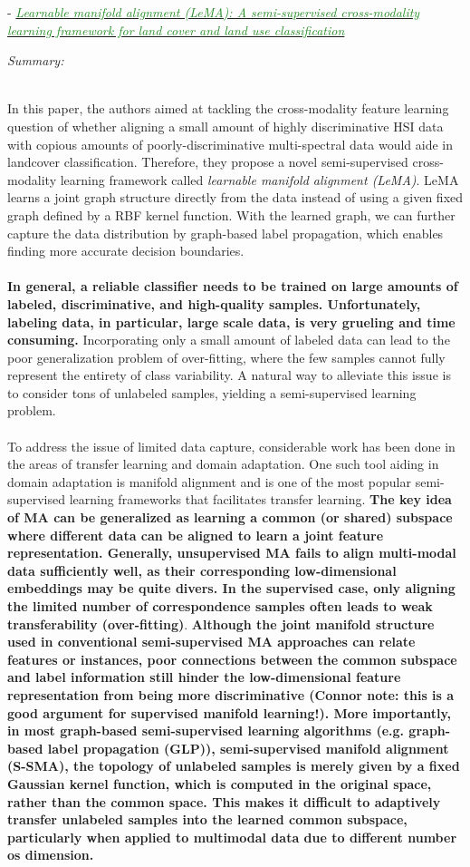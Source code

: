 \documentclass[]{article}
\newcommand{\paperentry}[4]{
            \hangindent=1cm
            \textcolor{red}{\cite{#1}} - \href{run:../References/#3}{\textcolor{ForestGreen}{\textit{#2}}}
            
            \noindent            
            \begin{minipage}[t]{0.1\linewidth}\hfill\end{minipage}
            \begin{minipage}[t]{0.8\linewidth}\textcolor{NavyBlue}{{\textit{Summary:}}}#4\end{minipage}
            \vspace{.25cm}
          }
\begin{document}
		
		\paperentry{Hong2019LearnableManifoldAlignment}
		{Learnable manifold alignment (LeMA): A semi-supervised cross-modality learning framework for land cover and land use classification}
		{Manifold_Representation_Learning/Alignment/Hong2019LearnableManifoldAlignment.pdf}
		{}\\
		In this paper, the authors aimed at tackling the cross-modality feature learning question of whether aligning a small amount of highly discriminative HSI data with copious amounts of poorly-discriminative multi-spectral data would aide in landcover classification.  Therefore, they propose a novel semi-supervised cross-modality learning framework called \textit{learnable manifold alignment (LeMA)}.  LeMA learns a joint graph structure directly from the data instead of using a given fixed graph defined by a RBF kernel function.  With the learned graph, we can further capture the data distribution by graph-based label propagation, which enables finding more accurate decision boundaries.
		\\ \\
		\textbf{In general, a reliable classifier needs to be trained on large amounts of labeled, discriminative, and high-quality samples.  Unfortunately, labeling data, in particular, large scale data, is very grueling and time consuming.} Incorporating only a small amount of labeled data can lead to the poor generalization problem of over-fitting, where the few samples cannot fully represent the entirety of class variability. A natural way to alleviate this issue is to consider tons of unlabeled samples, yielding a semi-supervised learning problem.
		\\ \\
		To address the issue of limited data capture, considerable work has been done in the areas of transfer learning and domain adaptation.  One such tool aiding in domain adaptation is manifold alignment and is one of the most popular semi-supervised learning frameworks that  facilitates transfer learning.  \textbf{The key idea of MA can be generalized as learning a common (or shared) subspace where different data can be aligned to learn a joint feature representation.  Generally, unsupervised MA fails to align multi-modal data sufficiently well, as their corresponding low-dimensional embeddings may be quite divers.  In the supervised case, only aligning the limited number of correspondence samples often leads to weak transferability (over-fitting)}.  \textbf{Although the joint manifold structure used in conventional semi-supervised MA approaches can relate features or instances, poor connections between the common subspace  and label information  still hinder the low-dimensional feature representation from being more discriminative (Connor note: this is a good argument for supervised manifold learning!).  More importantly, in most graph-based semi-supervised learning algorithms (e.g. graph-based label  propagation (GLP)), semi-supervised manifold alignment (S-SMA), the topology of unlabeled samples is merely given by a fixed Gaussian kernel function, which is computed in the original space, rather than the common space.  This makes it difficult to adaptively transfer unlabeled samples into the learned common subspace, particularly when applied to multimodal data due to different number os dimension.}
\end{document}
